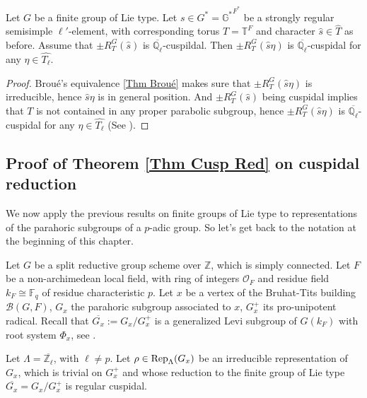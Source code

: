     \begin{lemma}\label{Lem Q_l-bar cuspidal}\label{Lemma Q_l-bar cuspidal}
    	Let $G$ be a finite group of Lie type. Let $s \in G^*=\mathbb{G^*}^{F^*}$ be a strongly regular semisimple $\ell'$-element, with corresponding torus $T=\mathbb{T}^F$ and character $\hat{s} \in \hat{T}$ as before. Assume that $\pm R_T^G(\hat{s})$ is $\overline{\mathbb{Q}_{\ell}}$-cuspildal. Then $\pm R_T^G(\hat{s}\eta)$ is $\overline{\mathbb{Q}_{\ell}}$-cuspidal for any $\eta \in \hat{T_{\ell}}$.
    \end{lemma}
    
    \begin{proof}
    	Broué's equivalence \ref{Thm Broué} makes sure that $\pm R_T^G(\hat{s}\eta)$ is irreducible, hence $\hat{s}\eta$ is in general position. And $\pm R_T^G(\hat{s})$ being cuspidal implies that $T$ is not contained in any proper parabolic subgroup, hence $\pm R_T^G(\hat{s}\eta)$ is $\overline{\mathbb{Q}_{\ell}}$-cuspidal for any $\eta \in \hat{T_{\ell}}$ (See \cite[Theorem 9.3.2]{carter1985finite}).
    \end{proof}
    
	
	

	
	
	
	\subsection{Proof of Theorem \ref{Thm Cusp Red} on cuspidal reduction}
	
	We now apply the previous results on finite groups of Lie type to representations of the parahoric subgroups of a $p$-adic group. So let's get back to the notation at the beginning of this chapter.
	
	Let $G$ be a split reductive group scheme over $\mathbb{Z}$, which is simply connected. Let $F$ be a non-archimedean local field, with ring of integers $\mathcal{O}_F$ and residue field $k_F \cong \mathbb{F}_q$ of residue characteristic $p$. Let $x$ be a vertex of the Bruhat-Tits building $\mathcal{B}(G, F)$, $G_x$ the parahoric subgroup associated to $x$, $G_x^+$ its pro-unipotent radical. Recall that $\overline{G_x}:=G_x/G_x^+$ is a generalized Levi subgroup of $G(k_F)$ with root system $\Phi_x$, see \cite[Theorem 3.17]{rabinoff2003bruhat}.
	
	Let $\Lambda=\overline{\mathbb{Z}_\ell}$, with $\ell \neq p$. Let $\rho \in \operatorname{\operatorname{Rep}}_{\Lambda}(G_x)$ be an irreducible representation of $G_x$, which is trivial on $G_x^+$ and whose reduction to the finite group of Lie type $\overline{G_x}=G_x/G_x^+$ is regular cuspidal. 
	
